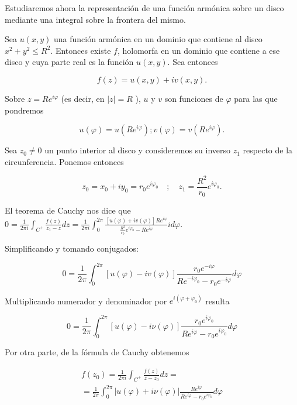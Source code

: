 \documentclass[10pt]{article}
\theoremstyle{plain}
\theoremstyle{definition}
\theoremstyle{remark}
\begin{document}
Estudiaremos ahora la representación de una función armónica sobre un disco mediante una integral sobre la frontera del mismo.

Sea $u(x, y)$ una función armónica en un dominio que contiene al disco $x^{2}+y^{2} \leqslant R^{2}$. Entonces existe $f$, holomorfa en un dominio que contiene a ese disco y cuya parte real es la función $u(x, y)$. Sea entonces

$$
f(z)=u(x, y)+i v(x, y) .
$$

Sobre $z=R e^{i \varphi}$ (es decir, en $|z|=R$ ), $u$ y $v$ son funciones de $\varphi$ para las que pondremos


\begin{equation*}
u(\varphi)=u\left(R e^{i \varphi}\right) ; v(\varphi)=v\left(R e^{i \varphi}\right) . \tag{15-1}
\end{equation*}


Sea $z_{0} \neq 0$ un punto interior al disco y consideremos su inverso $z_{1}$ respecto de la circunferencia. Ponemos entonces


\begin{equation*}
z_{0}=x_{0}+i y_{0}=r_{0} e^{i \varphi_{0}} \quad ; \quad z_{1}=\frac{R^{2}}{r_{0}} e^{i \varphi_{0}} . \tag{15-2}
\end{equation*}


El teorema de Cauchy nos dice que\\
$0=\frac{1}{2 \pi i} \int_{C^{+}} \frac{f(z)}{z_{1}-z} d z=\frac{1}{2 \pi i} \int_{0}^{2 \pi} \frac{[u(\varphi)+i v(\varphi)] R e^{i \varphi}}{\frac{R^{2}}{r_{0}} e^{i \varphi_{0}}-R e^{i \varphi}} i d \varphi$.

Simplificando y tomando conjugados:

$$
0=\frac{1}{2 \pi} \int_{0}^{2 \pi}[u(\varphi)-i v(\varphi)] \frac{r_{0} e^{-i \varphi}}{R e^{-i \varphi_{0}}-r_{0} e^{-i \varphi}} d \varphi
$$

Multiplicando numerador y denominador por $e^{i\left(\varphi+\varphi_{0}\right)}$ resulta

$$
0=\frac{1}{2 \pi} \int_{0}^{2 \pi}[u(\varphi)-i \nu(\varphi)] \frac{r_{0} e^{i \varphi_{0}}}{R e^{i \varphi}-r_{0} e^{i \varphi_{0}}} d \varphi
$$

Por otra parte, de la fórmula de Cauchy obtenemos

$$
\begin{gathered}
f\left(z_{0}\right)=\frac{1}{2 \pi i} \int_{C^{+}} \frac{f(z)}{z-z_{0}} d z= \\
=\frac{1}{2 \pi} \int_{0}^{2 \pi}|u(\varphi)+i \nu(\varphi)| \frac{R e^{i \varphi}}{R e^{i \varphi}-r_{0} e^{i \varphi_{0}}} d \varphi
\end{gathered}
$$
\end{document}

